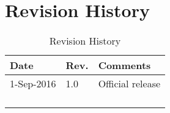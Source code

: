 \chapter{Revision History}\label{revision-history}

\begin{longtable}[]{@{}lll@{}}
\toprule
Date & Rev. & Comments\tabularnewline
\midrule
\endhead
1-Sep-2016 & 1.0 & Official release\tabularnewline
& &\tabularnewline
& &\tabularnewline
& &\tabularnewline
\bottomrule
\caption{Revision History}
\end{longtable}
